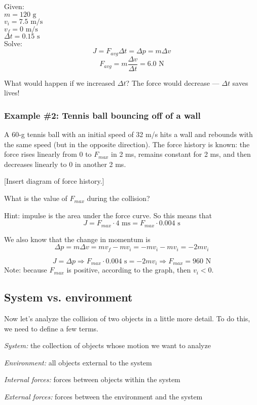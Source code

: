 Given:\\
$m=120\mbox{ g}$\\
$v_i=7.5\mbox{ m/s}$\\
$v_f=0\mbox{ m/s}$\\
$\Delta{t}=0.15\mbox{ s}$\\

Solve:
$$J=F_{avg}\Delta{t}=\Delta{p}=m\Delta{v}$$
$$F_{avg}=m\frac{\Delta{v}}{\Delta{t}}=6.0\mbox{ N}$$

What would happen if we increased $\Delta{t}$? The force would decrease --- $\Delta{t}$ saves lives!

\subsubsection*{Example \#2: Tennis ball bouncing off of a wall}
A 60-g tennis ball with an initial speed of 32 m/s hits a wall and rebounds with the same speed (but in the opposite direction). The force history is known: the force rises linearly from 0 to $F_{max}$ in 2 ms, remains constant for 2 ms, and then decreases linearly to 0 in another 2 ms.

[Insert diagram of force history.]
\vspace{5cm}

What is the value of $F_{max}$ during the collision?

Hint: impulse is the area under the force curve. So this means that 
$$J=F_{max}\cdot 4\mbox{ ms}=F_{max}\cdot 0.004\mbox{ s}$$

We also know that the change in momentum is 
$$\Delta{p}=m\Delta{v}=mv_f-mv_i=-mv_i-mv_i=-2mv_i$$

$$J=\Delta{p}\Rightarrow F_{max}\cdot 0.004\mbox{ s}=-2mv_i\Rightarrow F_{max}=960\mbox{ N}$$
Note: because $F_{max}$ is positive, according to the graph, then $v_i<0$.

\subsection{System vs. environment}
Now let's analyze the collision of two objects in a little more detail. To do this, we need to define a few terms.

\textit{System:} the collection of objects whose motion we want to analyze

\textit{Environment:} all objects external to the system

\textit{Internal forces:} forces between objects within the system

\textit{External forces:} forces between the environment and the system

